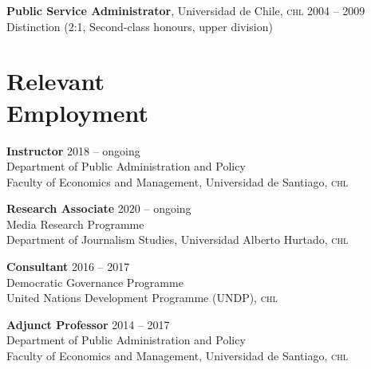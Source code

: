 \documentclass[letterpaper,margin]{res}
\begin{document}
\begin{resume}
{\small {\bfseries Public Service Administrator}, Universidad de Chile, {\scshape chl}}  \hfill {\small 2004 -- 2009}\\
{\small Distinction (2:1, Second-class honours, upper division)}


 \section{\footnotesize Relevant \\ Employment}
 
{\bf \small Instructor} \hfill {\small 2018 -- ongoing}\\
{\small Department of Public Administration and Policy}\\
{\small Faculty of Economics and Management, Universidad de Santiago, {\scshape chl}}

{\bf \small Research Associate} \hfill {\small 2020 -- ongoing}\\
{\small Media Research Programme}\\
{\small Department of Journalism Studies, Universidad Alberto Hurtado, {\scshape chl}}

{\bf \small Consultant} \hfill {\small 2016 -- 2017}\\
{\small Democratic Governance Programme}\\
{\small United Nations Development Programme ({\scshape UNDP}), {\scshape chl}}

{\small \bf Adjunct Professor} \hfill {\small 2014 -- 2017}\\
{\small Department of Public Administration and Policy}\\
{\small Faculty of Economics and Management, Universidad de Santiago, {\scshape chl}}



\end{resume}
\end{document}
